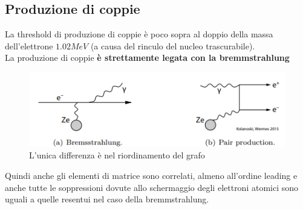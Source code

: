 \subsection{Produzione di coppie}
La threshold di produzione di coppie è poco sopra al doppio della massa dell'elettrone $1.02MeV$ (a causa del rinculo del nucleo trascurabile).
\\
La produzione di coppie \textbf{è  strettamente legata con la bremmstrahlung}

\hspace{-20pt}
\begin{minipage}{0.48\textwidth}
    \begin{figure}[H]
        \centering
        \includegraphics[width=\textwidth,frame]{Chapters/images/Interazione_radiazione_materia/image-20220220131152626.png}
        \captionsetup{width=\textwidth}
        \caption{L'unica differenza è nel riordinamento del grafo}
        \label{fig:brempair}
    \end{figure}
\end{minipage} \hfill
\begin{minipage}{0.48\textwidth}
Quindi anche gli elementi di matrice sono correlati, almeno all'ordine leading e anche tutte le soppressioni dovute allo schermaggio degli elettroni atomici sono uguali a quelle resentui nel caso della bremmstrahlung.
\end{minipage}
\vspace{10pt}
\\


